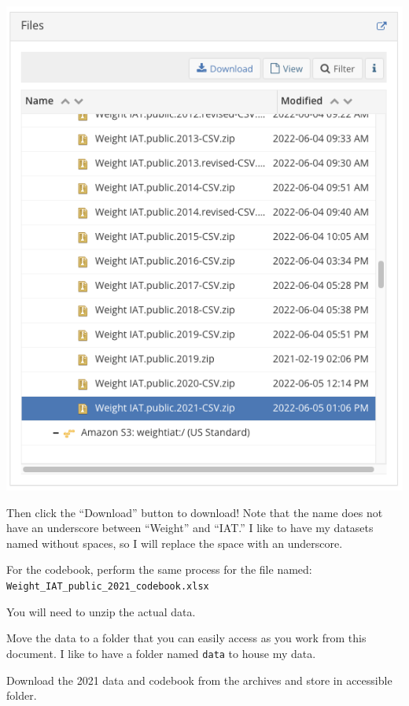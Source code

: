 \documentclass[
  letterpaper,
  DIV=11,
  numbers=noendperiod]{scrartcl}
\begin{document}
\includegraphics{images/data_access_3.png}

Then click the ``Download'' button to download! Note that the name does
not have an underscore between ``Weight'' and ``IAT.'' I like to have my
datasets named without spaces, so I will replace the space with an
underscore.

For the codebook, perform the same process for the file named:
\texttt{Weight\_IAT\_public\_2021\_codebook.xlsx}

You will need to unzip the actual data.

Move the data to a folder that you can easily access as you work from
this document. I like to have a folder named \texttt{data} to house my
data.

\begin{tcolorbox}[enhanced jigsaw, left=2mm, opacitybacktitle=0.6, arc=.35mm, colback=white, colframe=quarto-callout-important-color-frame, bottomrule=.15mm, opacityback=0, toptitle=1mm, toprule=.15mm, titlerule=0mm, colbacktitle=quarto-callout-important-color!10!white, rightrule=.15mm, leftrule=.75mm, title=\textcolor{quarto-callout-important-color}{\faExclamation}\hspace{0.5em}{Task Summary}, breakable, bottomtitle=1mm, coltitle=black]

Download the 2021 data and codebook from the archives and store in
accessible folder.

\end{tcolorbox}
\end{document}
